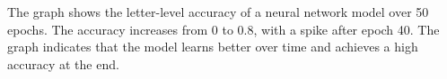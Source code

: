 The graph shows the letter-level accuracy of a neural network model over 50 epochs. The accuracy increases from 0 to 0.8, with a spike after epoch 40. The graph indicates that the model learns better over time and achieves a high accuracy at the end.



 
               
       

                        
        
